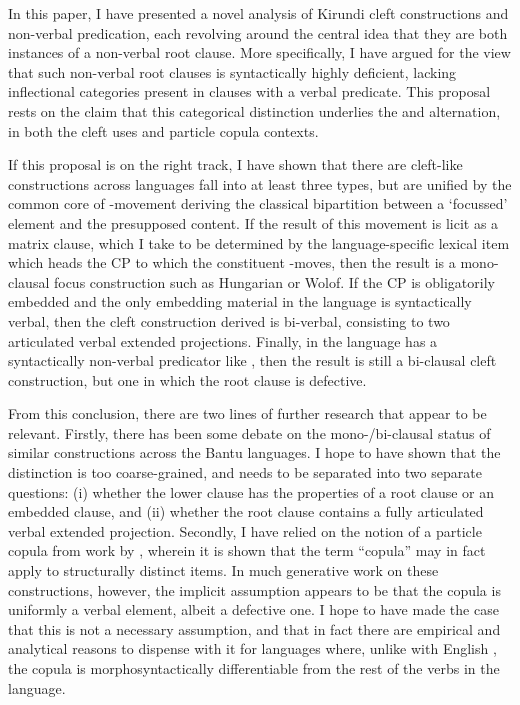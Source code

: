 \documentclass[12pt]{article}
\begin{document}
In this paper, I have presented a novel analysis of Kirundi cleft constructions and non-verbal predication, each revolving around the central idea that they are both instances of a non-verbal root clause. More specifically, I have argued for the view that such non-verbal root clauses is syntactically highly deficient, lacking inflectional categories present in clauses with a verbal predicate. This proposal rests on the claim that this categorical distinction underlies the  and  alternation, in both the cleft uses and particle copula contexts. 

If this proposal is on the right track, I have shown that there are cleft-like constructions across languages fall into at least three types, but are unified by the common core of \abar{}-movement deriving the classical bipartition between a `focussed' element and the presupposed content. If the result of this movement is licit as a matrix clause, which I take to be determined by the language-specific lexical item which heads the CP to which the constituent \abar{}-moves, then the result is a mono-clausal focus construction such as Hungarian or Wolof. If the CP is obligatorily embedded and the only embedding material in the language is syntactically verbal, then the cleft construction derived is bi-verbal, consisting to two articulated verbal extended projections. Finally, in the language has a syntactically non-verbal predicator like , then the result is still a bi-clausal cleft construction, but one in which the root clause is defective. 

From this conclusion, there are two lines of further research that appear to be relevant. Firstly, there has been some debate on the mono-/bi-clausal status of similar constructions across the Bantu languages. I hope to have shown that the distinction is too coarse-grained, and needs to be separated into two separate questions: (i) whether the lower clause has the properties of a root clause or an embedded clause, and (ii) whether the root clause contains a fully articulated verbal extended projection. Secondly, I have relied on the notion of a particle copula from work by \citet{pustet-2003}, wherein it is shown that the term ``copula'' may in fact apply to structurally distinct items. In much generative work on these constructions, however, the implicit assumption appears to be that the copula is uniformly a verbal element, albeit a defective one. I hope to have made the case that this is not a necessary assumption, and that in fact there are empirical and analytical reasons to dispense with it for languages where, unlike with English , the copula is morphosyntactically differentiable from the rest of the verbs in the language.
\end{document}
